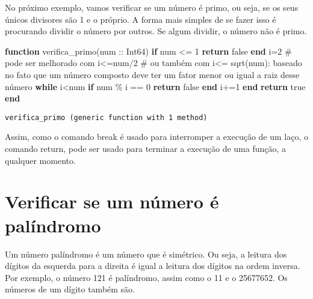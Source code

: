 \documentclass[
  letterpaper,
  DIV=11,
  numbers=noendperiod]{scrreprt}
\newenvironment{Shaded}{\begin{snugshade}}{\end{snugshade}}
\newcommand{\CommentTok}[1]{\textcolor[rgb]{0.37,0.37,0.37}{#1}}
\newcommand{\ConstantTok}[1]{\textcolor[rgb]{0.56,0.35,0.01}{#1}}
\newcommand{\ControlFlowTok}[1]{\textcolor[rgb]{0.00,0.23,0.31}{\textbf{#1}}}
\newcommand{\DataTypeTok}[1]{\textcolor[rgb]{0.68,0.00,0.00}{#1}}
\newcommand{\FloatTok}[1]{\textcolor[rgb]{0.68,0.00,0.00}{#1}}
\newcommand{\FunctionTok}[1]{\textcolor[rgb]{0.28,0.35,0.67}{#1}}
\newcommand{\KeywordTok}[1]{\textcolor[rgb]{0.00,0.23,0.31}{\textbf{#1}}}
\newcommand{\NormalTok}[1]{\textcolor[rgb]{0.00,0.23,0.31}{#1}}
\newcommand{\OperatorTok}[1]{\textcolor[rgb]{0.37,0.37,0.37}{#1}}
\begin{document}
No próximo exemplo, vamos verificar se um número é primo, ou seja, se os
seus únicos divisores são 1 e o próprio. A forma mais simples de se
fazer isso é procurando dividir o número por outros. Se algum dividir, o
número não é primo.

\begin{Shaded}
\begin{Highlighting}[]
\KeywordTok{function} \FunctionTok{verifica\_primo}\NormalTok{(num }\OperatorTok{::}\DataTypeTok{ Int64}\NormalTok{)}
    \ControlFlowTok{if}\NormalTok{ num }\OperatorTok{\textless{}=} \FloatTok{1}
        \ControlFlowTok{return} \ConstantTok{false}
    \ControlFlowTok{end}
\NormalTok{    i}\OperatorTok{=}\FloatTok{2}
    \CommentTok{\# pode ser melhorado com i\textless{}=num/2}
    \CommentTok{\# ou também com i\textless{}= sqrt(num): baseado no fato que um número composto deve ter um fator menor ou igual a raiz desse número}
    \ControlFlowTok{while}\NormalTok{ i}\OperatorTok{\textless{}}\NormalTok{num}
        \ControlFlowTok{if}\NormalTok{ num }\OperatorTok{\%}\NormalTok{ i }\OperatorTok{==} \FloatTok{0}
            \ControlFlowTok{return} \ConstantTok{false}
        \ControlFlowTok{end}
\NormalTok{        i}\OperatorTok{+=}\FloatTok{1}
    \ControlFlowTok{end}
    \ControlFlowTok{return} \ConstantTok{true}
\KeywordTok{end}
\end{Highlighting}
\end{Shaded}

\begin{verbatim}
verifica_primo (generic function with 1 method)
\end{verbatim}

Assim, como o comando break é usado para interromper a execução de um
laço, o comando return, pode ser usado para terminar a execução de uma
função, a qualquer momento.

\section{Verificar se um número é
palíndromo}\label{verificar-se-um-nuxfamero-uxe9-paluxedndromo}

Um número palíndromo é um número que é simétrico. Ou seja, a leitura dos
dígitos da esquerda para a direita é igual a leitura dos dígitos na
ordem inversa. Por exemplo, o número 121 é palíndromo, assim como o 11 e
o 25677652. Os números de um dígito também são.
\end{document}
